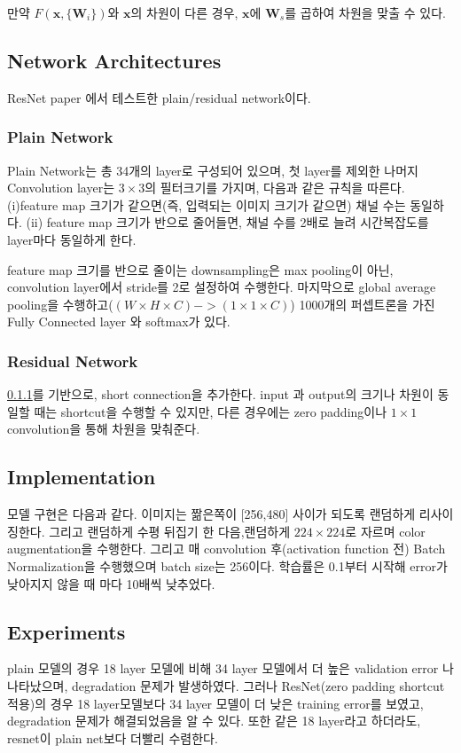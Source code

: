 \documentclass[extendedabs]{bmvc2k}
\begin{document}
만약 $F(\textbf{x},\{ \textbf{W}_i \})$와 $\textbf{x}$의 차원이 다른 경우, $\textbf{x}$에 $\textbf{W}_s$를 곱하여 차원을 맞출 수 있다.

\subsection{Network Architectures}
ResNet paper\cite{resnet} 에서 테스트한 plain/residual network이다.
\subsubsection{Plain Network} \label{Plain Network}
Plain Network는 총 34개의 layer로 구성되어 있으며, 첫 layer를 제외한 나머지 Convolution layer는 $3\times3$의 필터크기를 가지며, 다음과 같은 규칙을 따른다. (i)feature map 크기가 같으면(즉, 입력되는 이미지 크기가 같으면) 채널 수는 동일하다. (ii) feature map 크기가 반으로 줄어들면, 채널 수를 2배로 늘려 시간복잡도를 layer마다 동일하게 한다. 

feature map 크기를 반으로 줄이는 downsampling은 max pooling이 아닌, convolution layer에서 stride를 2로 설정하여 수행한다. 마지막으로 global average pooling을 수행하고($(W\times H\times C) -> (1\times1\times C)$) 1000개의 퍼셉트론을 가진 Fully Connected layer 와 softmax가 있다.
\subsubsection{Residual Network}
\ref{Plain Network}를 기반으로, short connection을 추가한다. input 과 output의 크기나 차원이 동일할 때는 shortcut을 수행할 수 있지만, 다른 경우에는 zero padding이나 $1\times1$ convolution을 통해 차원을 맞춰준다. 
\subsection{Implementation}
모델 구현은 다음과 같다. 이미지는 짦은쪽이 [256,480] 사이가 되도록 랜덤하게 리사이징한다. 그리고 랜덤하게 수평 뒤집기 한 다음,랜덤하게 $224\times224$로 자르며 color augmentation을 수행한다. 그리고 매 convolution 후(activation function 전) Batch Normalization을 수행했으며 batch size는 256이다. 학습률은 0.1부터 시작해 error가 낮아지지 않을 때 마다 10배씩 낮추었다.
\subsection{Experiments}
plain 모델의 경우 18 layer 모델에 비해 34 layer 모델에서 더 높은 validation error 나 나타났으며, degradation 문제가 발생하였다. 그러나 ResNet(zero padding shortcut 적용)의 경우 18 layer모델보다 34 layer 모델이 더 낮은 training error를 보였고, degradation 문제가 해결되었음을 알 수 있다. 또한 같은 18 layer라고 하더라도, resnet이 plain net보다 더빨리 수렴한다.
\end{document}

